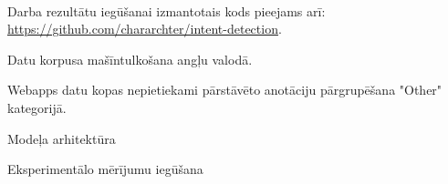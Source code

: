 
\\


Darba rezultātu iegūšanai izmantotais kods pieejams arī: \url{https://github.com/chararchter/intent-detection}.

Datu korpusa mašīntulkošana angļu valodā.




Webapps datu kopas nepietiekami pārstāvēto anotāciju pārgrupēšana "Other" kategorijā.




Modeļa arhitektūra




Eksperimentālo mērījumu iegūšana



